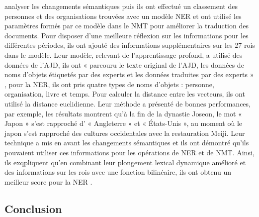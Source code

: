 \documentclass{article}
\begin{document}
analyser les changements sémantiques puis ils ont effectué un classement des personnes et des organisations trouvées avec un modèle NER et ont utilisé les paramètres formés par ce modèle dans le NMT pour améliorer la traduction des documents. Pour disposer d’une meilleure réflexion sur les informations pour les différentes périodes, ils ont ajouté des informations supplémentaires sur les 27 rois dans le modèle. Leur modèle, relevant de l’apprentissage profond, a utilisé des données de l’AJD, ils ont « parcouru le texte original de l’AJD, les données de noms d’objets étiquetés par des experts et les données traduites par des experts » \cite[p. 5]{jin2020korean}, pour la NER, ils ont pris quatre types de noms d’objets : personne, organisation, livre et temps. Pour calculer la distance entre les vecteurs, ils ont utilisé la distance euclidienne. Leur méthode a présenté de bonnes performances, par exemple, les résultats montrent qu’à la fin de la dynastie Joseon, le mot « Japon » s’est rapproché d’ « Angleterre » et « États-Unis », au moment où le japon s’est rapproché des cultures occidentales avec la restauration Meiji. Leur technique a mis en avant les changements sémantiques et ils ont démontré qu’ils pouvaient utiliser ces informations pour les opérations de NER et de NMT. Ainsi, ils exqpliquent qu'en combinant leur plongement lexical dynamique amélioré et des informations sur les rois avec une fonction bilinéaire, ils ont obtenu un meilleur score pour la NER \cite{jin2020korean}.
\subsection{Conclusion}
\end{document}
